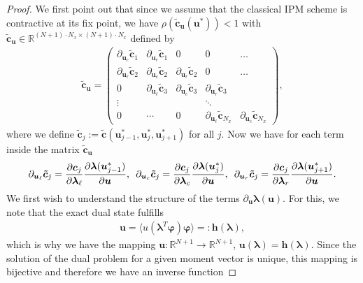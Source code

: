 \begin{proof}
We first point out that since we assume that the classical IPM scheme is contractive at its fix point, we have $\rho (\bm{\tilde c}_{\bm{u}}(\bm{u}^*))<1$ with $\bm{\tilde c}_{\bm{u}}\in\mathbb{R}^{(N+1)\cdot N_x\times (N+1)\cdot N_x}$ defined by
\begin{align*}
\bm{\tilde c}_{\bm{u}} = 
\begin{pmatrix} 
    \partial_{\bm{u}_c}\bm{\tilde c}_{1} & \partial_{\bm{u}_r}\bm{\tilde c}_{1}& 0 & 0 & \dots \\
    \partial_{\bm{u}_{\ell}}\bm{\tilde c}_{2} & \partial_{\bm{u}_c}\bm{\tilde c}_{2} & \partial_{\bm{u}_r}\bm{\tilde c}_{2}& 0 & \dots \\
    0 & \partial_{\bm{u}_{\ell}}\bm{\tilde c}_{3} & \partial_{\bm{u}_c}\bm{\tilde c}_{3} & \partial_{\bm{u}_r}\bm{\tilde c}_{3}\\
    \vdots & & & \ddots & \\
    0 &\cdots &  0 & \partial_{\bm{u}_{\ell}}\bm{\tilde c}_{N_x} & \partial_{\bm{u}_c}\bm{\tilde c}_{N_x}
    \end{pmatrix},
\end{align*}
where we define $\bm{\tilde c}_{j}:=\bm{\tilde c}\left(\bm{u}_{j-1}^*,\bm{u}_{j}^*,\bm{u}_{j+1}^*\right)$ for all $j$. Now we have for each term inside the matrix $\bm{\tilde c}_{\bm{u}}$
\begin{align}\label{eq:cTildeDer}
\partial_{\bm{u}_{\ell}}\bm{\tilde c}_{j} = \frac{\partial \bm{c}_j}{\partial \bm{\lambda}_{\ell}}\frac{\partial \bm{\lambda}(\bm{u}_{j-1}^*)}{\partial \bm{u}},\enskip\partial_{\bm{u}_c}\bm{\tilde c}_{j} = \frac{\partial \bm{c}_j}{\partial \bm{\lambda}_c}\frac{\partial \bm{\lambda}(\bm{u}_j^*)}{\partial \bm{u}},\enskip\partial_{\bm{u}_r}\bm{\tilde c}_{j} = \frac{\partial \bm{c}_j}{\partial \bm{\lambda}_r}\frac{\partial \bm{\lambda}(\bm{u}_{j+1}^*)}{\partial \bm{u}}.
\end{align}
We first wish to understand the structure of the terms $\partial_{\bm{u}} \bm{\lambda}(\bm{u})$. For this, we note that the exact dual state fulfills
\begin{align}\label{eq:ulambda}
\bm{u} = \langle u(\bm{\lambda}^T\bm{\varphi})\bm{\varphi}\rangle =: \bm{h}(\bm{\lambda}),
\end{align}
which is why we have the mapping $\bm{u}:\mathbb{R}^{N+1}\to\mathbb{R}^{N+1}$, $\bm{u}(\bm{\lambda}) = \bm{h}(\bm{\lambda})$. Since the solution of the dual problem for a given moment vector is unique, this mapping is bijective and therefore we have an inverse function

\end{proof}
